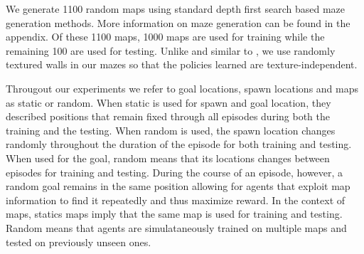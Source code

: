 We generate 1100 random maps using standard depth first search based maze generation methods. More information on maze generation can be found in the appendix. 
Of these 1100 maps, 1000 maps are used for training while the remaining 100 are used for testing.
Unlike \cite{MiPaViICLR2017} and similar to \cite{ChLaSaNIPS2016}, we use randomly textured walls in our mazes so that the policies learned are texture-independent.

Througout our experiments we refer to goal locations, spawn locations and maps as static or random.
When static is used for spawn and goal location, they described positions that remain fixed through all episodes during both the training and the testing.
When random is used, the spawn location changes randomly throughout the duration of the episode for both training and testing. When used for the goal, random means that its locations changes between episodes for training and testing. During the course of an episode, however, a random goal remains in the same position allowing for agents that exploit map information to find it repeatedly and thus maximize reward.
In the context of maps, statics maps imply that the same map is used for training and testing. Random means that agents are simulataneously trained on multiple maps and tested on previously unseen ones.






